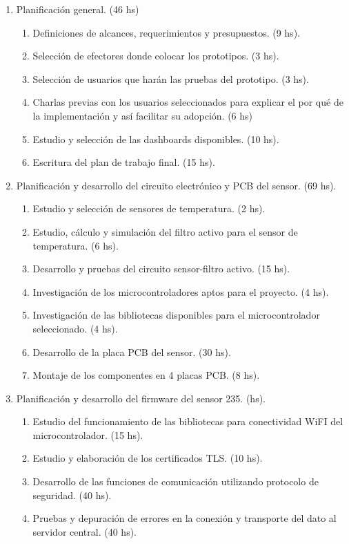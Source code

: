 \documentclass[11pt]{proyecto}
\begin{document}
\begin{enumerate}
\item Planificación general. (46 hs)
	\begin{enumerate}
	\item Definiciones de alcances, requerimientos y presupuestos. (9 hs).
	\item Selección de efectores donde colocar los prototipos. (3 hs).
	\item Selección de usuarios que harán las pruebas del prototipo. (3 hs).
	\item Charlas previas con los usuarios seleccionados para explicar el por qué de la implementación y así facilitar su adopción. (6 hs)
	\item Estudio y selección de las dashboards disponibles. (10 hs).
	\item Escritura del plan de trabajo final. (15 hs).
	\end{enumerate}
\item Planificación y desarrollo del circuito electrónico y PCB del sensor. (69 hs).
	\begin{enumerate}
	\item Estudio y selección de sensores de temperatura. (2 hs).
	\item Estudio, cálculo y simulación del filtro activo para el sensor de temperatura. (6 hs).
	\item Desarrollo y pruebas del circuito sensor-filtro activo. (15 hs).
    \item Investigación de los microcontroladores aptos para el proyecto. (4 hs).	
	\item Investigación de las bibliotecas disponibles para el microcontrolador seleccionado. (4 hs).
	\item Desarrollo de la placa PCB del sensor. (30 hs).
	\item Montaje de los componentes en 4 placas PCB. (8 hs).
	\end{enumerate}
\item Planificación y desarrollo del firmware del sensor 235.  (hs).
	\begin{enumerate}
	\item Estudio del funcionamiento de las bibliotecas para conectividad WiFI del microcontrolador. (15 hs).
	\item Estudio y elaboración de los certificados TLS.  (10 hs).
	\item Desarrollo de las funciones de comunicación utilizando protocolo de seguridad. (40 hs).
	\item Pruebas y depuración de errores en la conexión y transporte del dato al servidor central. (40 hs).

\end{enumerate}
\end{enumerate}
\end{document}
